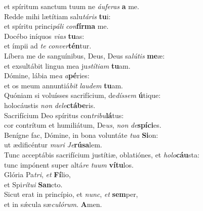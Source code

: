 \evenverse et spíritum sanctum tuum ne \textit{áu}\textit{fe}\textit{ras} \textbf{a} me.\\
\oddverse Redde mihi lætítiam salu\textit{tá}\textit{ris} \textbf{tu}i:~\*\\
\oddverse et spíritu princi\textit{pá}\textit{li} \textit{con}\textbf{fír}\textbf{ma} me.\\
\evenverse Docébo iníquos \textit{vi}\textit{as} \textbf{tu}as:~\*\\
\evenverse et ímpii ad \textit{te} \textit{con}\textit{ver}\textbf{tén}tur.\\
\oddverse Líbera me de sanguínibus, Deus, Deus sa\textit{lú}\textit{tis} \textbf{me}æ:~\*\\
\oddverse et exsultábit lingua mea ju\textit{stí}\textit{ti}\textit{am} \textbf{tu}am.\\
\evenverse Dómine, lábia me\textit{a} \textit{a}\textbf{pé}ries:~\*\\
\evenverse et os meum annuntiá\textit{bit} \textit{lau}\textit{dem} \textbf{tu}am.\\
\oddverse Quóniam si voluísses sacrifícium, de\textit{dís}\textit{sem} \textbf{ú}tique:~\*\\
\oddverse holocáustis \textit{non} \textit{de}\textit{le}\textbf{ctá}\textbf{be}ris.\\
\evenverse Sacrifícium Deo spíritus con\textit{tri}\textit{bu}\textbf{lá}tus:~\*\\
\evenverse cor contrítum et humiliátum, De\textit{us}, \textit{non} \textit{de}\textbf{spí}\textbf{ci}es.\\
\oddverse Benígne fac, Dómine, in bona voluntáte \textit{tu}\textit{a} \textbf{Si}on:~\*\\
\oddverse ut ædificéntur \textit{mu}\textit{ri} \textit{Je}\textbf{rú}\textbf{sa}lem.\\
\evenverse Tunc acceptábis sacrifícium justítiæ, oblatiónes, et \textit{ho}\textit{lo}\textbf{cáu}sta:~\*\\
\evenverse tunc impónent super altá\textit{re} \textit{tu}\textit{um} \textbf{ví}\textbf{tu}los.\\
\oddverse Glória Pa\textit{tri}, \textit{et} \textbf{Fí}lio,~\*\\
\oddverse et Spi\textit{rí}\textit{tu}\textit{i} \textbf{San}cto.\\
\evenverse Sicut erat in princípio, et \textit{nunc}, \textit{et} \textbf{sem}per,~\*\\
\evenverse et in sǽcula sæ\textit{cu}\textit{ló}\textit{rum}. \textbf{A}men.\\
